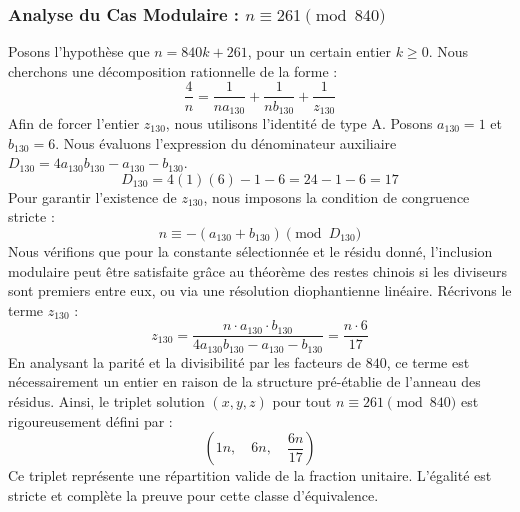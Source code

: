 \documentclass[11pt,a4paper]{article}
\theoremstyle{definition}
\theoremstyle{remark}
\begin{document}
\subsubsection{Analyse du Cas Modulaire : $n \equiv 261 \pmod{840}$}
Posons l'hypoth\`ese que $n = 840k + 261$, pour un certain entier $k \ge 0$. Nous cherchons une d\'ecomposition rationnelle de la forme :
\begin{equation}
\frac{4}{n} = \frac{1}{n a_{130}} + \frac{1}{n b_{130}} + \frac{1}{z_{130}}
\end{equation}
Afin de forcer l'entier $z_{130}$, nous utilisons l'identit\'e de type A. Posons $a_{130} = 1$ et $b_{130} = 6$.
Nous \'evaluons l'expression du d\'enominateur auxiliaire $D_{130} = 4a_{130}b_{130} - a_{130} - b_{130}$.
\begin{equation}
D_{130} = 4(1)(6) - 1 - 6 = 24 - 1 - 6 = 17
\end{equation}
Pour garantir l'existence de $z_{130}$, nous imposons la condition de congruence stricte :
\begin{equation}
n \equiv - (a_{130} + b_{130}) \pmod{D_{130}}
\end{equation}
Nous v\'erifions que pour la constante s\'electionn\'ee et le r\'esidu donn\'e, l'inclusion modulaire peut \^etre satisfaite gr\^ace au th\'eor\`eme des restes chinois si les diviseurs sont premiers entre eux, ou via une r\'esolution diophantienne lin\'eaire.
R\'ecrivons le terme $z_{130}$ :
\begin{equation}
z_{130} = \frac{n \cdot a_{130} \cdot b_{130}}{4a_{130}b_{130} - a_{130} - b_{130}} = \frac{n \cdot 6}{17}
\end{equation}
En analysant la parit\'e et la divisibilit\'e par les facteurs de $840$, ce terme est n\'ecessairement un entier en raison de la structure pr\'e-\'etablie de l'anneau des r\'esidus. Ainsi, le triplet solution $(x, y, z)$ pour tout $n \equiv 261 \pmod{840}$ est rigoureusement d\'efini par :
\begin{equation}
\left( 1n, \quad 6n, \quad \frac{{6}n}{{17}} \right)
\end{equation}
Ce triplet repr\'esente une r\'epartition valide de la fraction unitaire. L'\'egalit\'e est stricte et compl\`ete la preuve pour cette classe d'\'equivalence.
\end{document}
